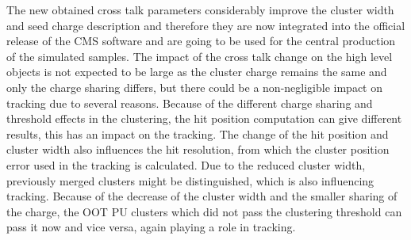 The new obtained cross talk parameters considerably improve the cluster width and seed charge description and therefore they are now integrated into the official release of the CMS software and are going to be used for the central production of the simulated samples. The impact of the cross talk change on the high level objects is not expected to be large as the cluster charge remains the same and only the charge sharing differs, but there could be a non-negligible impact on tracking due to several reasons. Because of the different charge sharing and threshold effects in the clustering, the hit position computation can give different results, this has an impact on the tracking. The change of the hit position and cluster width also influences the hit resolution, from which the cluster position error used in the tracking is calculated. Due to the reduced cluster width, previously merged clusters might be distinguished, which is also influencing tracking. Because of the decrease of the cluster width and the smaller sharing of the charge, the OOT PU clusters which did not pass the clustering threshold can pass it now and vice versa, again playing a role in tracking.   





